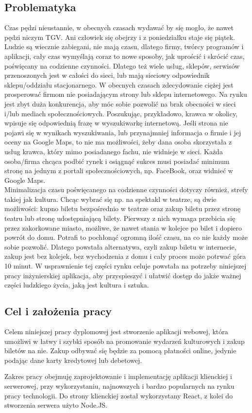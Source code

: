 \documentclass[12pt]{article}
\begin{document}
\begin{sloppypar}
{  \subsection{Problematyka}
  {
    Czas pędzi nieustannie, w obecnych czasach wydawać by się mogło, że nawet pędzi niczym TGV. Ani człowiek się obejrzy i z poniedziałku staje się piątek. 
    Ludzie są wiecznie zabiegani, nie mają czasu, dlatego firmy, twórcy programów i aplikacji, cały czas wymyślają coraz to nowe sposoby, jak uprościć i 
    skrócić czas, poświęcany na codzienne czynności.
    Dlatego też wiele usług, sklepów, serwisów przenoszonych jest w całości do sieci, lub mają sieciowy odpowiednik sklepu/oddziału stacjonarnego. 
    W obecnych czasach zdecydowanie ciężej jest prosperować firmom nie posiadającym strony lub sklepu internetowego. 
    Na rynku jest zbyt duża konkurencja, aby móc sobie pozwolić na brak obecności w sieci i/lub mediach społecznościowych. 
    Poszukując, przykładowo, krawca w okolicy, wpisuje się odpowiednią frazę w wyszukiwarkę internetową. Jeśli strona nie pojawi się w wynikach wyszukiwania, 
    lub przynajmniej informacja o firmie i jej oceny na Google Maps, to nie ma możliwości, 
    żeby dana osoba skorzystała z usług krawca, który mimo posiadanego fachu, nie widnieje w sieci. 
    Każda osoba/firma chcąca podbić rynek i osiągnąć sukces musi posiadać minimum stronę na jednym z portali społecznościowych, np. FaceBook, 
    oraz widnieć w Google Maps.\\
    Minimalizacja czasu poświęcanego na codzienne czynności dotyczy również, strefy takiej jak kultura. 
    Chcąc wybrać się np. na spektakl w teatrze, są dwie możliwości: kupno biletu bezpośrednio w teatrze oraz zakup biletu przez stronę teatru 
    lub stronę udostępniającą bilety.
    Pierwszy z nich wymaga przebicia się przez zakorkowane miasto, możliwe, że nawet stania w kolejce po bilet i dopiero powrót do domu. 
    Potrafi to pochłonąć ogromną ilość czasu, na co nie każdy może sobie pozwolić. 
    Dlatego powstała alternatywa, czyli zakup biletu w internecie, zakup jest bez kolejek, bez wychodzenia z domu i cały proces może potrwać góra 10 minut. 
    W usprawnienie tej części rynku celuje powstała na potrzeby niniejszej pracy inżynierskiej aplikacja, 
    aby przyspieszyć i ułatwić dostęp do jakże ważnej części ludzkiego życia, jaką jest kultura i sztuka. 
  }
  \subsection{Cel i założenia pracy}
  {
    Celem niniejszej pracy dyplomowej jest stworzenie aplikacji webowej, która umożliwi w łatwy i szybki
    sposób na promowanie wydarzeń kulturowych i zakup biletów na nie. Zakup odbywać się będzie za pomocą
    płatności online, jedynie podając dane karty kredytowej lub debetowej.\par
    Zakres pracy obejmuję zaprojektowanie i implementację aplikacji klienckiej i serwerowej, przy
    wykorzystaniu, najnowszych i bardzo popularnych na rynku pracy technologii. Do strony klienckiej
    został wykorzystany React, z kolei do stworzenia serwera użyto Node.JS.
  }
}
\end{sloppypar}
\end{document}
